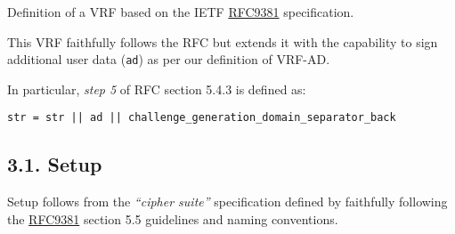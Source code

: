 \documentclass[
]{article}
\begin{document}
Definition of a VRF based on the IETF
\href{https://datatracker.ietf.org/doc/rfc9381}{RFC9381} specification.

This VRF faithfully follows the RFC but extends it with the capability
to sign additional user data (\texttt{ad}) as per our definition of
VRF-AD.

In particular, \emph{step 5} of RFC section 5.4.3 is defined as:

\begin{verbatim}
str = str || ad || challenge_generation_domain_separator_back
\end{verbatim}

\hypertarget{setup}{%
\subsection{3.1. Setup}\label{setup}}

Setup follows from the \emph{``cipher suite''} specification defined by
faithfully following the
\href{https://datatracker.ietf.org/doc/rfc9381}{RFC9381} section 5.5
guidelines and naming conventions.
\end{document}
